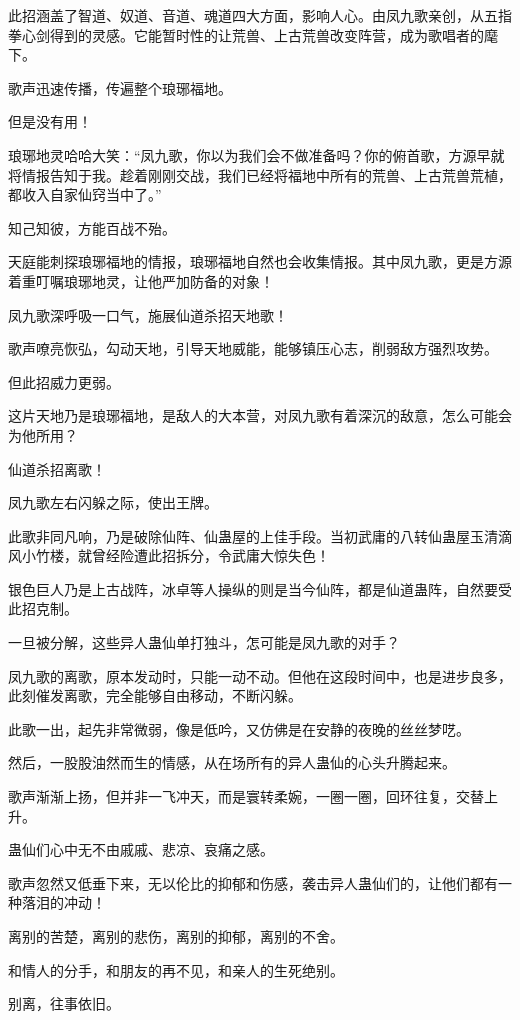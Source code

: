 \begin{this_body}
此招涵盖了智道、奴道、音道、魂道四大方面，影响人心。由凤九歌亲创，从五指拳心剑得到的灵感。它能暂时性的让荒兽、上古荒兽改变阵营，成为歌唱者的麾下。

歌声迅速传播，传遍整个琅琊福地。

但是没有用！

琅琊地灵哈哈大笑：“凤九歌，你以为我们会不做准备吗？你的俯首歌，方源早就将情报告知于我。趁着刚刚交战，我们已经将福地中所有的荒兽、上古荒兽荒植，都收入自家仙窍当中了。”

知己知彼，方能百战不殆。

天庭能刺探琅琊福地的情报，琅琊福地自然也会收集情报。其中凤九歌，更是方源着重叮嘱琅琊地灵，让他严加防备的对象！

凤九歌深呼吸一口气，施展仙道杀招天地歌！

歌声嘹亮恢弘，勾动天地，引导天地威能，能够镇压心志，削弱敌方强烈攻势。

但此招威力更弱。

这片天地乃是琅琊福地，是敌人的大本营，对凤九歌有着深沉的敌意，怎么可能会为他所用？

仙道杀招离歌！

凤九歌左右闪躲之际，使出王牌。

此歌非同凡响，乃是破除仙阵、仙蛊屋的上佳手段。当初武庸的八转仙蛊屋玉清滴风小竹楼，就曾经险遭此招拆分，令武庸大惊失色！

银色巨人乃是上古战阵，冰卓等人操纵的则是当今仙阵，都是仙道蛊阵，自然要受此招克制。

一旦被分解，这些异人蛊仙单打独斗，怎可能是凤九歌的对手？

凤九歌的离歌，原本发动时，只能一动不动。但他在这段时间中，也是进步良多，此刻催发离歌，完全能够自由移动，不断闪躲。

此歌一出，起先非常微弱，像是低吟，又仿佛是在安静的夜晚的丝丝梦呓。

然后，一股股油然而生的情感，从在场所有的异人蛊仙的心头升腾起来。

歌声渐渐上扬，但并非一飞冲天，而是寰转柔婉，一圈一圈，回环往复，交替上升。

蛊仙们心中无不由戚戚、悲凉、哀痛之感。

歌声忽然又低垂下来，无以伦比的抑郁和伤感，袭击异人蛊仙们的，让他们都有一种落泪的冲动！

离别的苦楚，离别的悲伤，离别的抑郁，离别的不舍。

和情人的分手，和朋友的再不见，和亲人的生死绝别。

别离，往事依旧。


\end{this_body}
